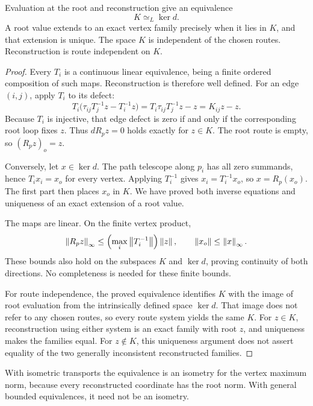 \begin{KStheorem}\label{KS:KS41}
Evaluation at the root and reconstruction give an equivalence
\[
 K\simeq_L\ker d.
\]
A root value extends to an exact vertex family precisely when it lies in \(K\), and that extension is unique. The space \(K\) is independent of the chosen routes. Reconstruction is route independent on \(K\).
\end{KStheorem}
\begin{proof}
Every \(T_i\) is a continuous linear equivalence, being a finite ordered composition of such maps. Reconstruction is therefore well defined. For an edge \((i,j)\), apply \(T_i\) to its defect:
\[
 T_i\bigl(\tau_{ij}T_j^{-1}z-T_i^{-1}z\bigr)
 =T_i\tau_{ij}T_j^{-1}z-z=K_{ij}z-z.
\]
Because \(T_i\) is injective, that edge defect is zero if and only if the corresponding root loop fixes \(z\). Thus \(dR_pz=0\) holds exactly for \(z\in K\). The root route is empty, so \((R_pz)_o=z\).

Conversely, let \(x\in\ker d\). The path telescope along \(p_i\) has all zero summands, hence \(T_ix_i=x_o\) for every vertex. Applying \(T_i^{-1}\) gives \(x_i=T_i^{-1}x_o\), so \(x=R_p(x_o)\). The first part then places \(x_o\) in \(K\). We have proved both inverse equations and uniqueness of an exact extension of a root value.

The maps are linear. On the finite vertex product,
\[
 \left\lVert R_pz\right\rVert_\infty\le\left(\max_i\left\lVert T_i^{-1}\right\rVert\right)\left\lVert z\right\rVert,
 \qquad \left\lVert x_o\right\rVert\le\left\lVert x\right\rVert_\infty.
\]
These bounds also hold on the subspaces \(K\) and \(\ker d\), proving continuity of both directions. No completeness is needed for these finite bounds.

For route independence, the proved equivalence identifies \(K\) with the image of root evaluation from the intrinsically defined space \(\ker d\). That image does not refer to any chosen routes, so every route system yields the same \(K\). For \(z\in K\), reconstruction using either system is an exact family with root \(z\), and uniqueness makes the families equal. For \(z\notin K\), this uniqueness argument does not assert equality of the two generally inconsistent reconstructed families.
\end{proof}
With isometric transports the equivalence is an isometry for the vertex maximum norm, because every reconstructed coordinate has the root norm. With general bounded equivalences, it need not be an isometry.


